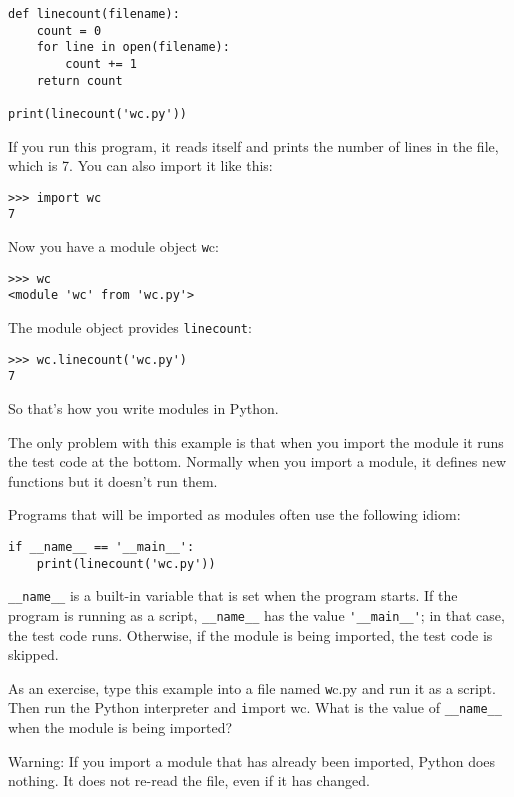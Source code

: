 \documentclass[
DIV=11,
fontsize=12,
twoside,
headinclude=false,
titlepage=firstiscover,
abstract=true,
headsepline=true,
footsepline=true,
chapterprefix=true, %
headings=big,
bibliography=totoc,%
captions=tableheading
]{scrbook}
\theoremstyle{definition}
\begin{document}
\begin{lstlisting}
def linecount(filename):
    count = 0
    for line in open(filename):
        count += 1
    return count

print(linecount('wc.py'))
\end{lstlisting}
%
If you run this program, it reads itself and prints the number
of lines in the file, which is 7.
You can also import it like this:

\begin{lstlisting}
>>> import wc
7
\end{lstlisting}
%
Now you have a module object {\texttt wc}:

\begin{lstlisting}
>>> wc
<module 'wc' from 'wc.py'>
\end{lstlisting}
%
The module object provides \verb"linecount":

\begin{lstlisting}
>>> wc.linecount('wc.py')
7
\end{lstlisting}
%
So that's how you write modules in Python.

The only problem with this example is that when you import
the module it runs the test code at the bottom.  Normally
when you import a module, it defines new functions but it
doesn't run them.

Programs that will be imported as modules often
use the following idiom:

\begin{lstlisting}
if __name__ == '__main__':
    print(linecount('wc.py'))
\end{lstlisting}
%
\verb"__name__" is a built-in variable that is set when the
program starts.  If the program is running as a script,
\verb"__name__" has the value \verb"'__main__'"; in that
case, the test code runs.  Otherwise,
if the module is being imported, the test code is skipped.


As an exercise, type this example into a file named {\texttt wc.py} and run
it as a script.  Then run the Python interpreter and
{\texttt import wc}.  What is the value of \verb"__name__"
when the module is being imported?

Warning: If you import a module that has already been imported,
Python does nothing.  It does not re-read the file, even if it has
changed.
\end{document}
